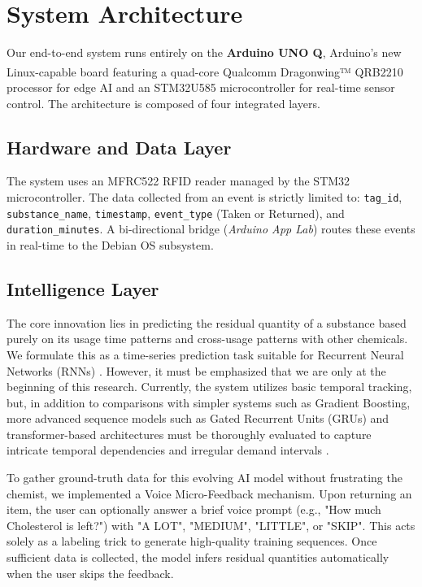 \documentclass[10pt,twocolumn,letterpaper]{article}
\begin{document}
\section{System Architecture}

Our end-to-end system runs entirely on the \textbf{Arduino UNO Q}, Arduino's new Linux-capable board featuring a quad-core Qualcomm\textsuperscript{\textregistered} Dragonwing™ QRB2210 processor for edge AI and an STM32U585 microcontroller for real-time sensor control. The architecture is composed of four integrated layers.

\subsection{Hardware and Data Layer}
The system uses an MFRC522 RFID reader managed by the STM32 microcontroller. The data collected from an event is strictly limited to: \texttt{tag\_id}, \texttt{substance\_name}, \texttt{timestamp}, \texttt{event\_type} (Taken or Returned), and \texttt{duration\_minutes}. A bi-directional bridge (\textit{Arduino App Lab}) routes these events in real-time to the Debian OS subsystem.

\subsection{Intelligence Layer}
The core innovation lies in predicting the residual quantity of a substance based purely on its usage time patterns and cross-usage patterns with other chemicals. We formulate this as a time-series prediction task suitable for Recurrent Neural Networks (RNNs) \cite{hochreiter1997long, cho2014learning}. However, it must be emphasized that we are only at the beginning of this research. Currently, the system utilizes basic temporal tracking, but, in addition to comparisons with simpler systems such as Gradient Boosting, more advanced sequence models such as Gated Recurrent Units (GRUs) and transformer-based architectures must be thoroughly evaluated to capture intricate temporal dependencies and irregular demand intervals \cite{wang2019deep}.

To gather ground-truth data for this evolving AI model without frustrating the chemist, we implemented a Voice Micro-Feedback mechanism. Upon returning an item, the user can optionally answer a brief voice prompt (e.g., "How much Cholesterol is left?") with "A LOT", "MEDIUM", "LITTLE", or "SKIP". This acts solely as a labeling trick to generate high-quality training sequences. Once sufficient data is collected, the model infers residual quantities automatically when the user skips the feedback.
\end{document}
